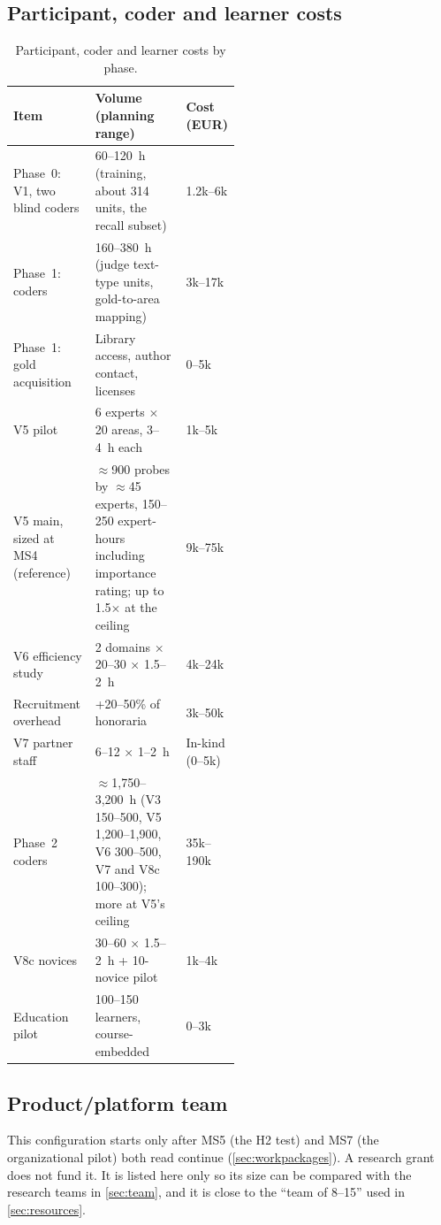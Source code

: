 \subsection{Participant, coder and learner costs}

\begin{table}[htbp]
  \centering
  \footnotesize
  \caption{Participant, coder and learner costs by phase.}
  \label{tab:resources-participants}
  \begin{tabularx}{\linewidth}{@{}Xp{0.4\linewidth}p{0.11\linewidth}@{}}
    \toprule
    Item & Volume (planning range) & Cost (EUR) \\
    \midrule
    Phase~0: V1, two blind coders & 60--120~h (training, about 314 units, the recall subset) &
      1.2k--6k \\
    Phase~1: coders & 160--380~h (judge text-type units, gold-to-area mapping) & 3k--17k \\
    Phase~1: gold acquisition & Library access, author contact, licenses & 0--5k \\
    V5 pilot & 6 experts $\times$ 20 areas, 3--4~h each & 1k--5k \\
    V5 main, sized at MS4 (reference) & $\approx$900 probes by $\approx$45 experts, 150--250 expert-hours
      including importance rating; up to 1.5$\times$ at the ceiling & 9k--75k \\
    V6 efficiency study & 2 domains $\times$ 20--30 $\times$ 1.5--2~h & 4k--24k \\
    Recruitment overhead & +20--50\% of honoraria & 3k--50k \\
    V7 partner staff & 6--12 $\times$ 1--2~h & In-kind (0--5k) \\
    Phase~2 coders & $\approx$1{,}750--3{,}200~h (V3 150--500, V5 1{,}200--1{,}900, V6 300--500,
      V7 and V8c 100--300); more at V5's ceiling & 35k--190k \\
    V8c novices & 30--60 $\times$ 1.5--2~h + 10-novice pilot & 1k--4k \\
    Education pilot & 100--150 learners, course-embedded & 0--3k \\
    \bottomrule
  \end{tabularx}
\end{table}

\subsection{Product/platform team}

\evfut{} This configuration starts only after MS5 (the H2 test) and MS7 (the organizational
pilot) both read continue (\cref{sec:workpackages}). A research grant does not fund it. It is
listed here only so its size can be compared with the research teams in \cref{sec:team}, and it is
close to the \enquote{team of 8--15} used in \cref{sec:resources}.

